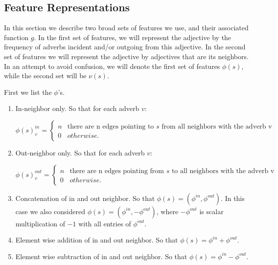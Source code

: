 \subsection{Feature Representations}

In this section we describe two broad sets of features we use, and their associated function $g$. In the first set of features, we will represent the adjective by the frequency of adverbs incident and/or outgoing from this adjective. In the second set of features we will represent the adjective by adjectives that are its neighbors. In an attempt to avoid confusion, we will denote the first set of features $\phi(s)$, while the second set will be $\nu(s)$.

First we list the $\phi$'s.

\begin{enumerate}
	\item In-neighbor only. So that for each adverb $v$:

		\[   
		\phi(s)^{in}_v = \left\{
		\begin{array}{ll}
		      n & \text{there are n edges pointing to $s$ from all neighbors with the adverb v} \\
		      0 & otherwise.
		\end{array} 
		\right.
		\]

	\item Out-neighbor only. So that for each adverb $v$:

		\[   
		\phi(s)^{out}_v = \left\{
		\begin{array}{ll}
		      n & \text{there are n edges pointing from $s$ to all neighbors with the adverb v} \\
		      0 & otherwise.
		\end{array} 
		\right. 
		\]

	\item Concatenation of in and out neighbor. So that $\phi(s) = (\phi^{in}, \phi^{out})$. In this case we also considered $\phi(s) = (\phi^{in}, - \phi^{out})$, where $- \phi^{out}$ is scalar multiplication of $-1$ with all entries of $\phi^{out}$.

	\item Element wise addition of in and out neighbor. So that $\phi(s) = \phi^{in} + \phi^{out}$.
	
	\item Element wise subtraction of in and out neighbor. So that $\phi(s) = \phi^{in} - \phi^{out}$.

\end{enumerate}

